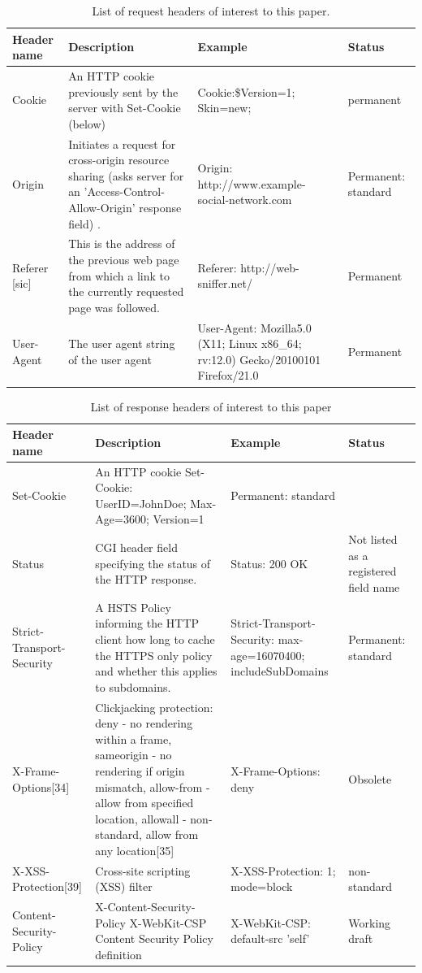 \documentclass[a4paper,12pt]{paper}
\begin{document}
\begin{table}
\centering
\begin{tabular}{p{2cm}|p{6cm}|p{4cm}|p{2cm}}
Header name & Description & Example & Status \\\hline

Cookie & An HTTP cookie previously sent by the server with Set-Cookie (below) & Cookie:\$Version=1; Skin=new; & permanent \\
Origin &Initiates a request for cross-origin resource sharing (asks server for an 'Access-Control-Allow-Origin' response field) . & Origin: http://www.example-social-network.com & Permanent: standard\\
Referer [sic] & This is the address of the previous web page from which a link to the currently requested page was followed. & Referer: http://web-sniffer.net/ & Permanent\\
User-Agent & The user agent string of the user agent & User-Agent: Mozilla\/5.0 (X11; Linux x86\_64; rv:12.0) Gecko/20100101 Firefox/21.0 &Permanent
\end{tabular}
\caption{\label{tab:req}List of request headers of interest to this paper.}
\end{table}


\begin{table}[H]
\centering
\begin{tabular}{p{2cm}|p{6cm}|p{4cm}|p{2cm}}
Header name & Description & Example & Status \\\hline
Set-Cookie &	An HTTP cookie 	Set-Cookie: UserID=JohnDoe; Max-Age=3600; Version=1 &Permanent: standard\\
Status &CGI header field specifying the status of the HTTP response. &	Status: 200 OK 	& Not listed as a registered field name\\
Strict-Transport-Security & A HSTS Policy informing the HTTP client how long to cache the HTTPS only policy and whether this applies to subdomains. &Strict-Transport-Security: max-age=16070400; includeSubDomains &Permanent: standard\\
X-Frame-Options[34] &Clickjacking protection: deny - no rendering within a frame, sameorigin - no rendering if origin mismatch, allow-from - allow from specified location, allowall - non-standard, allow from any location[35] &X-Frame-Options: deny &Obsolete\\
X-XSS-Protection[39] &Cross-site scripting (XSS) filter &X-XSS-Protection: 1; mode=block& non-standard \\
Content-Security-Policy &X-Content-Security-Policy X-WebKit-CSP Content Security Policy definition& X-WebKit-CSP: default-src 'self' & Working draft
\end{tabular}
\caption{\label{tab:resp}List of response headers of interest to this paper}
\end{table}
\end{document}
